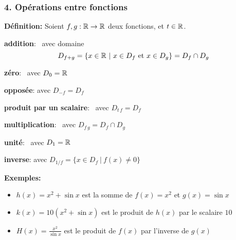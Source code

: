 \begin{frame}
\frametitle{\bf 4. Op\'erations entre fonctions}
\medskip 

{\bf D\'efinition:} 
Soient $f,g:\mathbb R\rightarrow\mathbb R$ deux fonctions, et $t\in\mathbb R$. 
\vspace*{1mm}

\begin{itemize}
\bitem
{\bf addition}:\  avec domaine 
\vspace*{-1mm}
$$
D_{f+g} =\{x\in\R\ |\ \mbox{$x\in D_f$ et $x\in D_g$} \} = D_f\cap D_g
\vspace*{-1mm}
$$

{\bf z\'ero}:\  avec $D_0=\mathbb R$
\vspace*{1mm}

{\bf oppos\'ee}:  avec $D_{-f}=D_f$
\vspace*{1mm}

\pause
\bitem
{\bf produit par un scalaire}:\  avec 
$D_{t\,f}=D_f$
\vspace*{1mm}

\pause
\bitem
{\bf multiplication}:\  avec 
$D_{f\,g}=D_f\cap D_g$
\vspace*{1mm}

{\bf unit\'e}:\  avec $D_1=\mathbb R$
\vspace*{0.5mm}

{\bf inverse}:  
avec $D_{1/f}=\{x\in D_f\ |\ f(x)\neq 0 \}$
\end{itemize}
\vspace*{0.5mm}

\pause
{\small 
{\bf Exemples:}
\begin{itemize}
\item
$h(x)=x^2+\sin x$ est la somme de $f(x)=x^2$ et $g(x)=\sin x$

\item
$k(x)=10(x^2+\sin x)$ est le produit de $h(x)$ par le scalaire $10$ 

\item
$H(x)=\frac{x^2}{\sin x}$ est le produit de $f(x)$ par l'inverse de $g(x)$
\end{itemize}
}

\end{frame}


